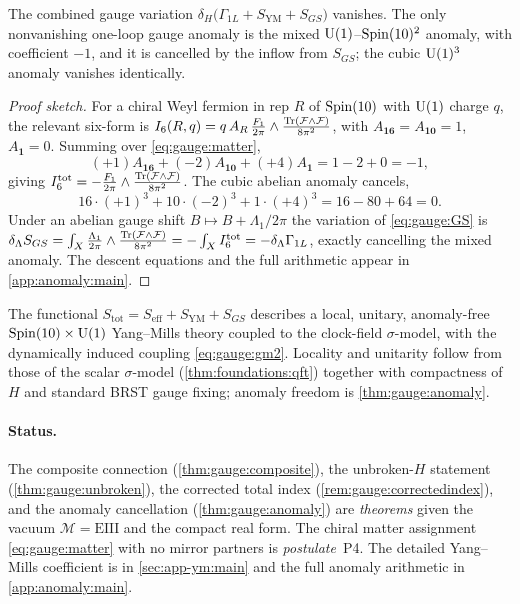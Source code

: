 \begin{theorem}\label{thm:gauge:anomaly}
\label{sec:anomaly:main}
The combined gauge variation
$\delta_H\bigl(\Gamma_{1L}+S_{\text{YM}}+S_{GS}\bigr)$ vanishes. The only
nonvanishing one-loop gauge anomaly is the mixed $\mathrm{U}(1)$--$\operatorname{Spin}(10)^{2}$
anomaly, with coefficient $-1$, and it is cancelled by the inflow from
$S_{GS}$; the cubic $\mathrm{U}(1)^{3}$ anomaly vanishes identically.
\end{theorem}

\begin{proof}[Proof sketch]
For a chiral Weyl fermion in rep $R$ of $\operatorname{Spin}(10)$ with $\mathrm{U}(1)$ charge
$q$, the relevant six-form is
$I_6(R,q)=q\,A_R\,\frac{F_1}{2\pi}\wedge\frac{\operatorname{Tr}(\mathcal F\wedge\mathcal F)}{8\pi^2}$,
with $A_{\mathbf{16}}=A_{\mathbf{10}}=1$, $A_{\mathbf 1}=0$. Summing over
\eqref{eq:gauge:matter},
\begin{equation}\label{eq:gauge:mixed}
  (+1)A_{\mathbf{16}}+(-2)A_{\mathbf{10}}+(+4)A_{\mathbf 1}
  = 1-2+0 = -1,
\end{equation}
giving $I_6^{\text{tot}}=-\frac{F_1}{2\pi}\wedge\frac{\operatorname{Tr}(\mathcal F\wedge\mathcal F)}{8\pi^2}$.
The cubic abelian anomaly cancels,
\begin{equation}\label{eq:gauge:cubic}
  16\cdot(+1)^{3}+10\cdot(-2)^{3}+1\cdot(+4)^{3}
  = 16 - 80 + 64 = 0.
\end{equation}
Under an abelian gauge shift $B\mapsto B+\Lambda_1/2\pi$ the variation of
\eqref{eq:gauge:GS} is
$\delta_\Lambda S_{GS}=\int_X\frac{\Lambda_1}{2\pi}\wedge\frac{\operatorname{Tr}(\mathcal F\wedge\mathcal F)}{8\pi^2}=-\int_X I_6^{\text{tot}}=-\delta_\Lambda\Gamma_{1L}$,
exactly cancelling the mixed anomaly. The descent equations and the full
arithmetic appear in \autoref{app:anomaly:main}.
\end{proof}

\begin{theorem}\label{thm:gauge:sector}
\label{thm:foundations:qft}
The functional $S_{\text{tot}}=S_{\text{eff}}+S_{\text{YM}}+S_{GS}$
describes a local, unitary, anomaly-free $\operatorname{Spin}(10)\times\mathrm{U}(1)$
Yang--Mills theory coupled to the clock-field $\sigma$-model, with the
dynamically induced coupling \eqref{eq:gauge:gm2}. Locality and unitarity
follow from those of the scalar $\sigma$-model (\autoref{thm:foundations:qft})
together with compactness of $H$ and standard BRST gauge fixing; anomaly
freedom is \autoref{thm:gauge:anomaly}.
\end{theorem}

\paragraph{Status.} The composite connection
(\autoref{thm:gauge:composite}), the unbroken-$H$ statement
(\autoref{thm:gauge:unbroken}), the corrected total index
(\autoref{rem:gauge:correctedindex}), and the anomaly cancellation
(\autoref{thm:gauge:anomaly}) are \emph{theorems} given the vacuum
$\mathcal M=\mathrm{EIII}$ and the compact real form. The chiral matter
assignment \eqref{eq:gauge:matter} with no mirror partners is
\emph{postulate}~P4. The detailed Yang--Mills coefficient is in
\autoref{sec:app-ym:main} and the full anomaly arithmetic in
\autoref{app:anomaly:main}.
